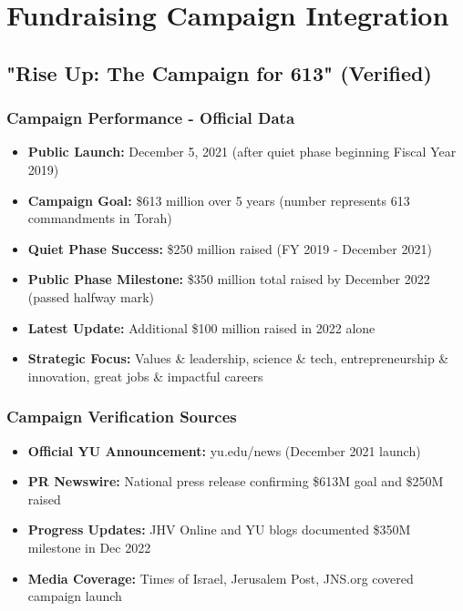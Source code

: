 \documentclass[12pt,letterpaper]{article}
\begin{document}
\section{Fundraising Campaign Integration}

\subsection{"Rise Up: The Campaign for 613" (Verified)}

\subsubsection{Campaign Performance - Official Data}
\begin{itemize}[leftmargin=*]
    \item \textbf{Public Launch:} December 5, 2021 (after quiet phase beginning Fiscal Year 2019)
    \item \textbf{Campaign Goal:} \$613 million over 5 years (number represents 613 commandments in Torah)
    \item \textbf{Quiet Phase Success:} \$250 million raised (FY 2019 - December 2021)
    \item \textbf{Public Phase Milestone:} \$350 million total raised by December 2022 (passed halfway mark)
    \item \textbf{Latest Update:} Additional \$100 million raised in 2022 alone
    \item \textbf{Strategic Focus:} Values \& leadership, science \& tech, entrepreneurship \& innovation, great jobs \& impactful careers
\end{itemize}

\subsubsection{Campaign Verification Sources}
\begin{itemize}[leftmargin=*]
    \item \textbf{Official YU Announcement:} yu.edu/news (December 2021 launch)
    \item \textbf{PR Newswire:} National press release confirming \$613M goal and \$250M raised
    \item \textbf{Progress Updates:} JHV Online and YU blogs documented \$350M milestone in Dec 2022
    \item \textbf{Media Coverage:} Times of Israel, Jerusalem Post, JNS.org covered campaign launch
\end{itemize}
\end{document}
